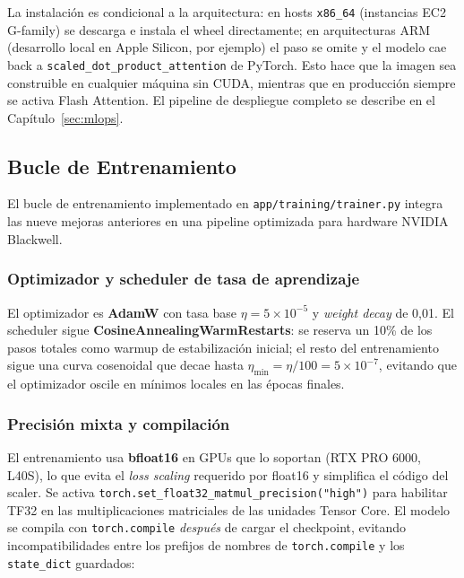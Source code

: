 La instalación es condicional a la arquitectura: en hosts \texttt{x86\_64} (instancias EC2 G-family) se descarga e instala el wheel directamente; en arquitecturas ARM (desarrollo local en Apple Silicon, por ejemplo) el paso se omite y el modelo cae back a \texttt{scaled\_dot\_product\_attention} de PyTorch. Esto hace que la imagen sea construible en cualquier máquina sin CUDA, mientras que en producción siempre se activa Flash Attention. El pipeline de despliegue completo se describe en el Capítulo~\ref{sec:mlops}.

\subsection{Bucle de Entrenamiento}
\label{subsec:training_loop}

El bucle de entrenamiento implementado en \texttt{app/training/trainer.py} integra las nueve mejoras anteriores en una pipeline optimizada para hardware NVIDIA Blackwell.

\subsubsection*{Optimizador y scheduler de tasa de aprendizaje}

El optimizador es \textbf{AdamW} con tasa base $\eta = 5 \times 10^{-5}$ y \textit{weight decay} de 0,01. El scheduler sigue \textbf{CosineAnnealingWarmRestarts}: se reserva un 10\% de los pasos totales como warmup de estabilización inicial; el resto del entrenamiento sigue una curva cosenoidal que decae hasta $\eta_{\min} = \eta / 100 = 5 \times 10^{-7}$, evitando que el optimizador oscile en mínimos locales en las épocas finales.

\subsubsection*{Precisión mixta y compilación}

El entrenamiento usa \textbf{bfloat16} en GPUs que lo soportan (RTX PRO 6000, L40S), lo que evita el \textit{loss scaling} requerido por float16 y simplifica el código del scaler. Se activa \texttt{torch.set\_float32\_matmul\_precision("high")} para habilitar TF32 en las multiplicaciones matriciales de las unidades Tensor Core. El modelo se compila con \texttt{torch.compile} \textit{después} de cargar el checkpoint, evitando incompatibilidades entre los prefijos de nombres de \texttt{torch.compile} y los \texttt{state\_dict} guardados:

